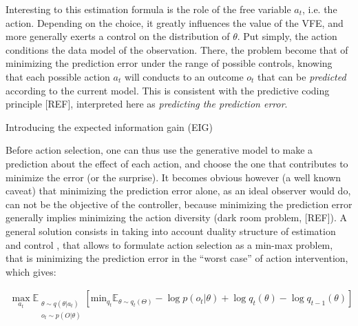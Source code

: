 \documentclass[10pt,letterpaper]{article}
\begin{document}
Interesting to this estimation formula is the role of the free variable $a_t$, i.e. the action. Depending on the choice, it greatly influences the value of the VFE, and more generally exerts a control on the distribution of $\theta$. Put simply, the action conditions the data model of the observation. %
There, the problem become that of minimizing the prediction error under the range of possible controls, knowing that each possible action $a_t$ will conducts to an outcome $o_t$ that can be \emph{predicted} according to the current model. 
This is consistent with the predictive coding principle [REF], interpreted here as \emph{predicting the prediction error}.

{\color{blue} Introducing the expected information gain (EIG)}

Before action selection, one can thus use the generative model to make a prediction about the effect of each action, and choose the one that contributes to minimize the error (or the surprise). 
It becomes obvious however (a well known caveat) that minimizing the prediction error alone, as an ideal observer would do, can not be the objective of the controller, because minimizing the prediction error generally implies minimizing the action diversity (dark room problem, [REF]).
A general solution consists in taking into account duality structure of estimation and control \cite{todorov2001optimal}, that allows to formulate action selection as a min-max problem, that is minimizing the prediction error in the ``worst case'' of action intervention, which gives:

\begin{align}\label{eq:VFE}
\max_{a_t} \mathbb{E}_{\substack{\theta\sim q(\theta|a_t) \\ o_t\sim p(O|\theta)}} \left[\text{min}_{q_t} \mathbb{E}_{\theta\sim q_t(\Theta)} -\log p(o_t|\theta) + \log q_t(\theta) - \log q_{t-1}(\theta)\right]
\end{align}
\end{document}

